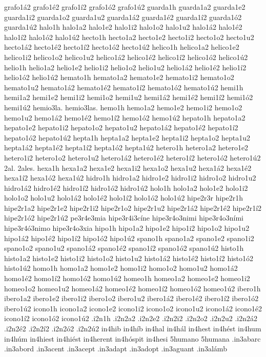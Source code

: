 {grafo1á2 grafo1é2 grafo1í2 grafo1ó2 grafo1ú2
guarda1h
guarda1a2 guarda1e2 guarda1i2 guarda1o2 guarda1u2
guarda1á2 guarda1é2 guarda1í2 guarda1ó2 guarda1ú2
halo1h
halo1a2 halo1e2 halo1i2 halo1o2 halo1u2
halo1á2 halo1é2 halo1í2 halo1ó2 halo1ú2
hecto1h
hecto1a2 hecto1e2 hecto1i2 hecto1o2 hecto1u2
hecto1á2 hecto1é2 hecto1í2 hecto1ó2 hecto1ú2
helico1h
helico1a2 helico1e2 helico1i2 helico1o2 helico1u2
helico1á2 helico1é2 helico1í2 helico1ó2 helico1ú2
helio1h
helio1a2 helio1e2 helio1i2 helio1o2 helio1u2
helio1á2 helio1é2 helio1í2 helio1ó2 helio1ú2
hemato1h
hemato1a2 hemato1e2 hemato1i2 hemato1o2 hemato1u2
hemato1á2 hemato1é2 hemato1í2 hemato1ó2 hemato1ú2
hemi1h
hemi1a2 hemi1e2 hemi1i2 hemi1o2 hemi1u2
hemi1á2 hemi1é2 hemi1í2 hemi1ó2 hemi1ú2
hemio3la.
hemio3las.
hemo1h
hemo1a2 hemo1e2 hemo1i2 hemo1o2 hemo1u2
hemo1á2 hemo1é2 hemo1í2 hemo1ó2 hemo1ú2
hepato1h
hepato1a2 hepato1e2 hepato1i2 hepato1o2 hepato1u2
hepato1á2 hepato1é2 hepato1í2 hepato1ó2 hepato1ú2
hepta1h
hepta1a2 hepta1e2 hepta1i2 hepta1o2 hepta1u2
hepta1á2 hepta1é2 hepta1í2 hepta1ó2 hepta1ú2
hetero1h
hetero1a2 hetero1e2 hetero1i2 hetero1o2 hetero1u2
hetero1á2 hetero1é2 hetero1í2 hetero1ó2 hetero1ú2
2al.
2ales.
hexa1h
hexa1a2 hexa1e2 hexa1i2 hexa1o2 hexa1u2
hexa1á2 hexa1é2 hexa1í2 hexa1ó2 hexa1ú2
hidro1h
hidro1a2 hidro1e2 hidro1i2 hidro1o2 hidro1u2
hidro1á2 hidro1é2 hidro1í2 hidro1ó2 hidro1ú2
holo1h
holo1a2 holo1e2 holo1i2 holo1o2 holo1u2
holo1á2 holo1é2 holo1í2 holo1ó2 holo1ú2
hipe2r3r
hipe2r1h
hipe2r1a2 hipe2r1e2 hipe2r1i2 hipe2r1o2 hipe2r1u2
hipe2r1á2 hipe2r1é2 hipe2r1í2 hipe2r1ó2 hipe2r1ú2
pe3r4e3mia
hipe3r4i3cíne
hipe3r4o3nimi
hipe3r4o3ními
hipe3r4ó3nimo
hipe3r4o3xia
hipo1h
hipo1a2 hipo1e2 hipo1i2 hipo1o2 hipo1u2
hipo1á2 hipo1é2 hipo1í2 hipo1ó2 hipo1ú2
spano1h
spano1a2 spano1e2 spano1i2 spano1o2 spano1u2
spano1á2 spano1é2 spano1í2 spano1ó2 spano1ú2
histo1h
histo1a2 histo1e2 histo1i2 histo1o2 histo1u2
histo1á2 histo1é2 histo1í2 histo1ó2 histo1ú2
homo1h
homo1a2 homo1e2 homo1i2 homo1o2 homo1u2
homo1á2 homo1é2 homo1í2 homo1ó2 homo1ú2
homeo1h
homeo1a2 homeo1e2 homeo1i2 homeo1o2 homeo1u2
homeo1á2 homeo1é2 homeo1í2 homeo1ó2 homeo1ú2
ibero1h
ibero1a2 ibero1e2 ibero1i2 ibero1o2 ibero1u2
ibero1á2 ibero1é2 ibero1í2 ibero1ó2 ibero1ú2
icono1h
icono1a2 icono1e2 icono1i2 icono1o2 icono1u2
icono1á2 icono1é2 icono1í2 icono1ó2 icono1ú2
.i2n1h
.i2n2a2 .i2n2e2 .i2n2i2 .i2n2o2 .i2n2u2
.i2n2á2 .i2n2é2 .i2n2í2 .i2n2ó2 .i2n2ú2
in4hib
in4híb
in4hal
in4hál
in4hest
in4hést
in4hum
in4húm
in4hiest
in4hiést
in4herent
in4hóspit
in4hesi
5humano
5humana
.in3abarc
.in3abord
.in3acent
.in3acept
.in3adapt
.in3adopt
.in3aguant
.in3alámb
}
